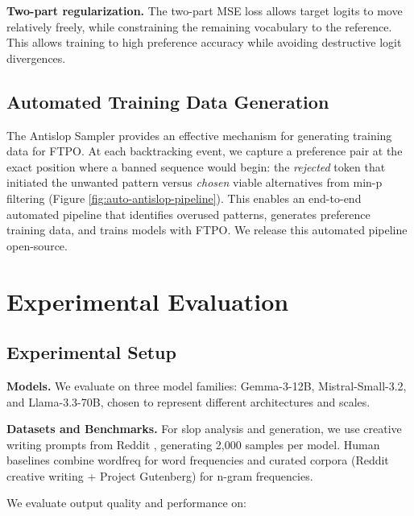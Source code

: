 \documentclass[11pt]{article}
\begin{document}
\textbf{Two-part regularization.} The two-part MSE loss allows target logits to move relatively freely, while constraining the remaining vocabulary to the reference. This allows training to high preference accuracy while avoiding destructive logit divergences.




\subsection{Automated Training Data Generation}

The Antislop Sampler provides an effective mechanism for generating training data for FTPO. At each backtracking event, we capture a preference pair at the exact position where a banned sequence would begin: the \textit{rejected} token that initiated the unwanted pattern versus \textit{chosen} viable alternatives from min-p filtering (Figure \ref{fig:auto-antislop-pipeline}). This enables an end-to-end automated pipeline that identifies overused patterns, generates preference training data, and trains models with FTPO. We release this automated pipeline open-source.





\section{Experimental Evaluation}
\subsection{Experimental Setup}

\textbf{Models.} We evaluate on three model families: Gemma-3-12B, Mistral-Small-3.2, and Llama-3.3-70B, chosen to represent different architectures and scales.

\textbf{Datasets and Benchmarks.} 
For slop analysis and generation, we use creative writing prompts from Reddit \citep{nitral_reddit_sfw_wp_sharegpt}, generating 2,000 samples per model. Human baselines combine wordfreq \citep{robyn_speer_2018_1443582} for word frequencies and curated corpora (Reddit creative writing + Project Gutenberg) for n-gram frequencies.


We evaluate output quality and performance on:
\end{document}
